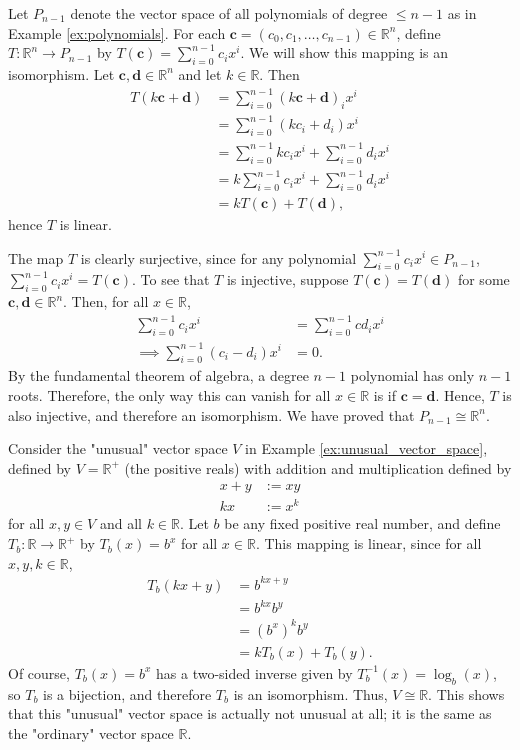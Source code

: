 \documentclass[12pt,letterpaper,reqno]{article}
\numberwithin{equation}{section}
\newcommand{\R}{\ensuremath{\mathbb R}}
\begin{document}
\begin{example}[$P_{n-1} \cong \R^n$]\label{ex:p_n_minus_one_cong_r_n}
Let $P_{n-1}$ denote the vector space of all polynomials of degree $\leq n-1$ as in Example \ref{ex:polynomials}. For each $\mathbf{c}=(c_0,c_1,\dots,c_{n-1}) \in \R^n$, define $T:\R^n \to P_{n-1}$ by $T(\mathbf{c})=\sum_{i=0}^{n-1}c_ix^i$. We will show this mapping is an isomorphism. Let $\mathbf{c}, \mathbf{d} \in \R^n$ and let $k \in \R$. Then
\begin{align*}
	T(k\mathbf{c}+\mathbf{d})&=\sum_{i=0}^{n-1}(k\mathbf{c}+\mathbf{d})_ix^i \\
	&=\sum_{i=0}^{n-1}(kc_i+d_i)x^i \\
	&=\sum_{i=0}^{n-1}kc_ix^i+\sum_{i=0}^{n-1}d_ix^i \\
	&=k\sum_{i=0}^{n-1}c_ix^i+\sum_{i=0}^{n-1}d_ix^i \\
	&=kT(\mathbf{c})+T(\mathbf{d}),
\end{align*}
hence $T$ is linear.

The map $T$ is clearly surjective, since for any polynomial $\sum_{i=0}^{n-1}c_ix^i \in P_{n-1}$, $\sum_{i=0}^{n-1}c_ix^i=T(\mathbf{c})$. To see that $T$ is injective, suppose $T(\mathbf{c})=T(\mathbf{d})$ for some $\mathbf{c},\mathbf{d} \in \R^n$. Then, for all $x \in \R$,
\begin{align*}
	\sum_{i=0}^{n-1}c_ix^i&=\sum_{i=0}^{n-1}cd_ix^i \\
	\implies \sum_{i=0}^{n-1}(c_i-d_i)x^i&=0.
\end{align*}
By the fundamental theorem of algebra, a degree $n-1$ polynomial has only $n-1$ roots. Therefore, the only way this can vanish for all $x \in \R$ is if $\mathbf{c}=\mathbf{d}$. Hence, $T$ is also injective, and therefore an isomorphism. We have proved that $P_{n-1} \cong \R^n$.
\end{example}

\begin{example}
	Consider the "unusual" vector space $V$ in Example \ref{ex:unusual_vector_space}, defined by $V=\R^+$ (the positive reals) with addition and multiplication defined by
	\begin{align*}
		x+y&:=xy \\
		kx&:=x^k 
	\end{align*}
	for all $x,y \in V$ and all $k \in \R$. Let $b$ be any fixed positive real number, and define $T_b:\R \to \R^+$ by $T_b(x)=b^x$ for all $x \in \R$. This mapping is linear, since for all $x,y,k \in \R$, 
	\begin{align*}
		T_b(kx+y)&=b^{kx+y} \\
		&=b^{kx}b^y \\
		&=(b^x)^kb^y \\
		&=kT_b(x)+T_b(y).
	\end{align*}
	Of course, $T_b(x)=b^x$ has a two-sided inverse given by $T_b^{-1}(x)=\log_b(x)$, so $T_b$ is a bijection, and therefore $T_b$ is an isomorphism. Thus, $V \cong \R$. This shows that this "unusual" vector space is actually not unusual at all; it is the same as the "ordinary" vector space $\R$.
\end{example}
\end{document}
